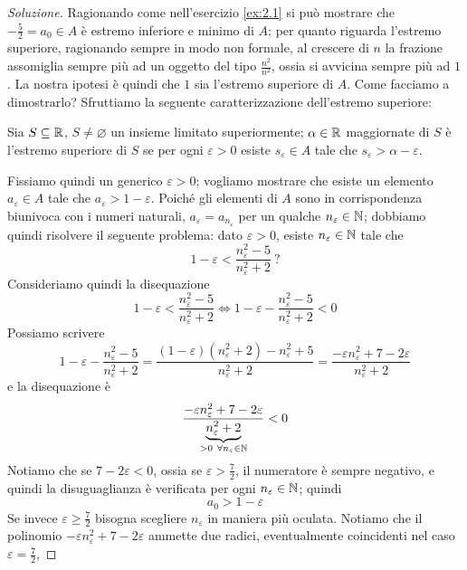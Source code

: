 \begin{proof}[Soluzione]
    Ragionando come nell'esercizio \ref{ex:2.1} si può mostrare che $-\frac{5}{2} = a_0\in A$ è estremo inferiore e minimo di $A$; per quanto riguarda l'estremo superiore, ragionando sempre in modo non formale, al crescere di $n$ la frazione assomiglia sempre più ad un oggetto del tipo $\frac{n^2}{n^2}$, ossia si avvicina sempre più ad $1$. La nostra ipotesi è quindi che $1$ sia l'estremo superiore di $A$. Come facciamo a dimostrarlo? Sfruttiamo la seguente caratterizzazione dell'estremo superiore:
    \begin{tcolorbox}
        \begin{theorem}
            \label{th:2.2}
            Sia $S\subseteq \amsbb{R}$, $S\ne \varnothing$ un insieme limitato superiormente; $\alpha\in \amsbb{R}$ maggiornate di $S$ è l'estremo superiore di $S$ se per ogni $\varepsilon>0$ esiste $s_{\varepsilon}\in A$ tale che $s_\varepsilon>\alpha-\varepsilon$.
        \end{theorem}
    \end{tcolorbox}
    Fissiamo quindi un generico $\varepsilon>0$; vogliamo mostrare che esiste un elemento $a_\varepsilon\in A$ tale che $a_\varepsilon>1-\varepsilon$. Poiché gli elementi di $A$ sono in corrispondenza biunivoca con i numeri naturali, $a_\varepsilon = a_{n_\varepsilon}$ per un qualche $n_\varepsilon \in \amsbb{N}$; dobbiamo quindi risolvere il seguente problema: dato $\varepsilon>0$, esiste $n_\varepsilon\in\amsbb{N}$ tale che
    \[
    1-\varepsilon<\frac{n_\varepsilon^2-5}{n_\varepsilon^2+2} \ \text{?}
    \]
    Consideriamo quindi la disequazione
    \[
    1-\varepsilon < \frac{n_\varepsilon^2-5}{n_\varepsilon^2+2} \iff 1-\varepsilon - \frac{n_\varepsilon^2-5}{n_\varepsilon^2+2} <0
    \]
    Possiamo scrivere
    \[
    1-\varepsilon-\frac{n_\varepsilon^2-5}{n_\varepsilon^2+2} = \frac{(1-\varepsilon)(n_\varepsilon^2+2)-n_\varepsilon^2+5}{n_\varepsilon^2+2} = \frac{-\varepsilon n_\varepsilon^2+7-2\varepsilon}{n_\varepsilon^2+2}
    \]
    e la disequazione è
    \[
    \frac{-\varepsilon n_\varepsilon^2 + 7 -2\varepsilon}{\underbrace{n_\varepsilon^2+2}_{>0 \ \forall n_\varepsilon \in \amsbb{N}}}<0
    \]
    Notiamo che se $7-2\varepsilon<0$, ossia se $\varepsilon>\frac{7}{2}$, il numeratore è sempre negativo, e quindi la disuguaglianza è verificata per ogni $n_\varepsilon\in\amsbb{N}$; quindi
    \[
    a_0> 1-\varepsilon
    \]
    Se invece $\varepsilon\ge\frac{7}{2}$ bisogna scegliere $n_\varepsilon$ in maniera più oculata. Notiamo che il polinomio $-\varepsilon n_\varepsilon^2 +7-2\varepsilon$ ammette due radici, eventualmente coincidenti nel caso $\varepsilon=\frac{7}{2}$,

\end{proof}
